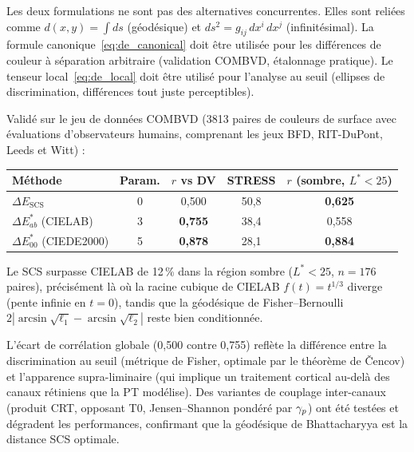 \documentclass[12pt,a4paper]{article}
\begin{document}
\begin{remark}
Les deux formulations ne sont pas des alternatives concurrentes. Elles
sont reli\'ees comme $d(x,y) = \int ds$ (g\'eod\'esique) et
$ds^2 = g_{ij}\,dx^i\,dx^j$ (infinit\'esimal). La formule
canonique~\eqref{eq:de_canonical} doit \^etre utilis\'ee pour les
diff\'erences de couleur \`a s\'eparation arbitraire (validation COMBVD,
\'etalonnage pratique). Le tenseur local~\eqref{eq:de_local} doit
\^etre utilis\'e pour l'analyse au seuil (ellipses de discrimination,
diff\'erences tout juste perceptibles).
\end{remark}

\medskip

Valid\'e sur le jeu de donn\'ees COMBVD (3813 paires de couleurs de
surface avec \'evaluations d'observateurs humains, comprenant les jeux
BFD, RIT-DuPont, Leeds et Witt) :
\begin{center}
\begin{tabular}{lcccc}
\toprule
M\'ethode & Param. & $r$ vs DV & STRESS & $r$ (sombre, $L^*<25$) \\
\midrule
$\Delta E_{\mathrm{SCS}}$ & 0 & 0{,}500 & 50{,}8 & \textbf{0{,}625} \\
$\Delta E^*_{ab}$ (CIELAB) & 3 & \textbf{0{,}755} & 38{,}4 & 0{,}558 \\
$\Delta E^*_{00}$ (CIEDE2000) & 5 & \textbf{0{,}878} & 28{,}1 & \textbf{0{,}884} \\
\bottomrule
\end{tabular}
\end{center}
Le SCS surpasse CIELAB de 12\,\% dans la r\'egion sombre ($L^* < 25$,
$n = 176$ paires), pr\'ecis\'ement l\`a o\`u la racine cubique de
CIELAB $f(t) = t^{1/3}$ diverge (pente infinie en $t = 0$), tandis que
la g\'eod\'esique de Fisher--Bernoulli
$2|\arcsin\sqrt{\ell_1} - \arcsin\sqrt{\ell_2}|$ reste bien
conditionn\'ee.

L'\'ecart de corr\'elation globale (0{,}500 contre 0{,}755) refl\`ete
la diff\'erence entre la discrimination au seuil (m\'etrique de Fisher,
optimale par le th\'eor\`eme de \v{C}encov) et l'apparence
supra-liminaire (qui implique un traitement cortical au-del\`a des
canaux r\'etiniens que la PT mod\'elise). Des variantes de couplage
inter-canaux (produit CRT, opposant T0, Jensen--Shannon pond\'er\'e par
$\gamma_{p}$) ont \'et\'e test\'ees et d\'egradent les performances,
confirmant que la g\'eod\'esique de Bhattacharyya est la distance
SCS optimale.

\end{document}
